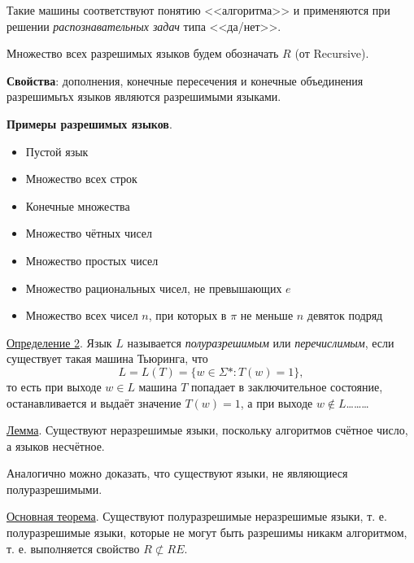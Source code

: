 Такие машины соответствуют понятию <<алгоритма>> и применяются при решении \textit{распознавательных задач} типа <<да/нет>>.

Множество всех разрешимых языков будем обозначать $R$ (от Recursive).

\textbf{Свойства}: дополнения, конечные пересечения и конечные объединения разрешимыъх языков являются разрешимыми языками.

\textbf{Примеры разрешимых языков}.
\begin{itemize}
    \item Пустой язык
    \item Множество всех строк
    \item Конечные множества
    \item Множество чётных чисел
    \item Множество простых чисел
    \item Множество рациональных чисел, не превышающих $e$
    \item Множество всех чисел $n$, при которых в $\pi$ не меньше $n$ девяток подряд
\end{itemize}

\underline{Определение 2}. Язык $L$ называется \textit{полуразрешимым} или \textit{перечислимым}, если существует такая машина Тьюринга, что
\begin{equation}
    L = L(T) = \{w \in \Sigma* : T(w) = 1\},
\end{equation}
то есть при выходе $w \in L$ машина $T$ попадает в заключительное состояние, останавливается и выдаёт значение $T(w) = 1$, а при выходе $w \not \in L$\dots\dots\dots

\underline{Лемма}. Существуют неразрешимые языки, поскольку алгоритмов счётное число, а языков несчётное.

Аналогично можно доказать, что существуют языки, не являющиеся полуразрешимыми.

\underline{Основная теорема}. Существуют полуразрешимые неразрешимые языки, т. е. полуразрешимые языки, которые не могут быть разрешимы никакм алгоритмом, т. е. выполняется свойство $R \not \subset RE$.
